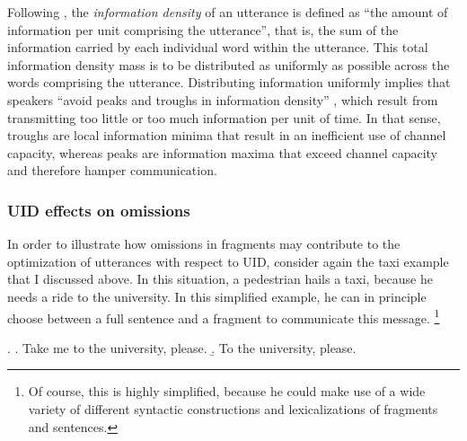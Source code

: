 Following \citet[849]{levy.jaeger2007}, the \textit{information density} of an utterance is defined as ``the amount of information per unit comprising the utterance'', that is, the sum of the information carried by each individual word within the utterance. This total information density mass is to be distributed as uniformly as possible across the words comprising the utterance. Distributing information uniformly implies that speakers ``avoid peaks and troughs in information density'' \citep[849]{levy.jaeger2007}, which result from transmitting too little or too much information per unit of time. In that sense, troughs are local information minima that result in an inefficient use of channel capacity, whereas peaks are information maxima that exceed channel capacity and therefore hamper communication. %

\subsubsection{UID effects on omissions}
In order to illustrate how omissions in fragments may contribute to the optimization of utterances with respect to UID, consider again the taxi example that I discussed above. In this situation, a pedestrian hails a taxi, because he needs a ride to the university. In this simplified example, he can in principle choose between a full sentence \Next[a] and a fragment \Next[b] to communicate this message.%
%
\footnote{Of course, this is highly simplified, because he could make use of a wide variety of different syntactic constructions and lexicalizations of fragments and sentences.}\afterfn%
% 

\ex. \label{ex:uid-taxi}
\a. Take me to the university, please.
     \b. To the university, please.

